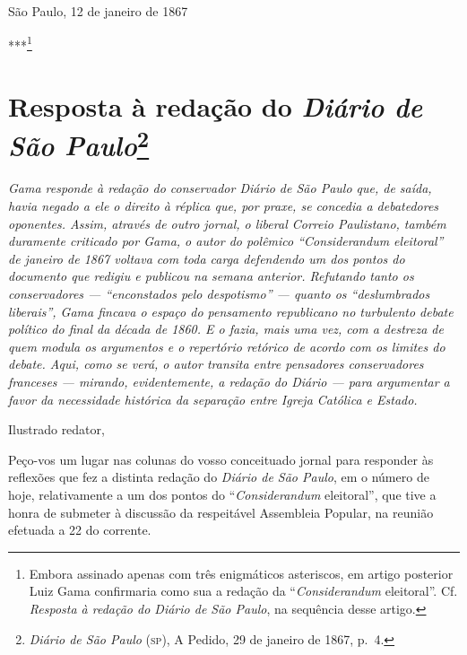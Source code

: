 \begin{flushright}
São Paulo, 12 de janeiro de 1867

***\footnote{Embora assinado apenas com três enigmáticos asteriscos,
  em artigo posterior Luiz Gama confirmaria como sua a redação da
  ``\textit{Considerandum} eleitoral''. Cf. \emph{Resposta à redação do Diário de
  São Paulo}, na sequência desse artigo.}
\end{flushright}

\chapter{Resposta à redação do \emph{Diário de São Paulo}\footnote{
  \emph{Diário de São Paulo} (\textsc{sp}), A Pedido, 29 de janeiro de 1867, p.~4.}}

\begin{didascalia}\itshape
Gama responde à redação do conservador \textnormal{Diário de São Paulo} que, de
saída, havia negado a ele o direito à réplica que, por praxe, se
concedia a debatedores oponentes. Assim, através de outro jornal, o
liberal \textnormal{Correio Paulistano}, também duramente criticado por Gama,
o autor do polêmico ``\textnormal{Considerandum} eleitoral'' de janeiro de 1867
voltava com toda carga defendendo um dos pontos do documento que redigiu
e publicou na semana anterior. Refutando tanto os conservadores ---
``enconstados pelo despotismo'' --- quanto os ``deslumbrados liberais'', Gama
fincava o espaço do pensamento republicano no turbulento debate político
do final da década de 1860. E o fazia, mais uma vez, com a destreza de
quem modula os argumentos e o repertório retórico de acordo com os
limites do debate. Aqui, como se verá, o autor transita entre pensadores
conservadores franceses --- mirando, evidentemente, a redação do \textnormal{Diário}
--- para argumentar a favor da necessidade histórica da separação
entre Igreja Católica e Estado.
\end{didascalia}



Ilustrado redator,

Peço-vos um lugar nas colunas do vosso conceituado jornal para responder
às reflexões que fez a distinta redação do \emph{Diário de São Paulo}, em
o número de hoje, relativamente a um dos pontos do ``\textit{Considerandum}
eleitoral'', que tive a honra de submeter à discussão da respeitável
Assembleia Popular, na reunião efetuada a 22 do corrente.

